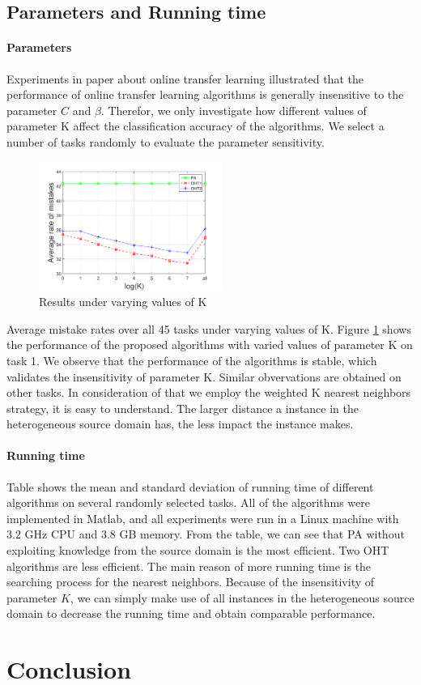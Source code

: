 \documentclass[letterpaper]{article}
\begin{document}
\subsection{Parameters and Running time}
\paragraph{Parameters}
Experiments in paper about online transfer learning illustrated that the performance of online transfer learning algorithms is generally insensitive to the parameter $C$ and $\beta$.
Therefor, we only investigate how different values of parameter K affect the classification accuracy of the algorithms.
We select a number of tasks randomly to evaluate the parameter sensitivity.


\begin{figure}[!htb]
\begin{center}
  \includegraphics[width=6cm]{average.pdf}
  \caption{Results under varying values of K}
  \label{average eok}
\end{center}
\end{figure}

Average mistake rates over all 45 tasks under varying values of K.
Figure \ref{average eok} shows the performance of the proposed algorithms with varied values of parameter K on task 1.
We observe that the performance of the algorithms is stable, which validates the insensitivity of parameter K.
Similar obvervations are obtained on other tasks.
In consideration of that we employ the weighted K nearest neighbors strategy, it is easy to understand.
The larger distance a instance in the heterogeneous source domain has, the less impact the instance makes.

\paragraph{Running time}
Table shows the mean and standard deviation of running time of different algorithms on several randomly selected tasks.
All of the algorithms were implemented in Matlab, and all experiments were run in a Linux machine with 3.2 GHz CPU and 3.8 GB memory.
From the table, we can see that PA without exploiting knowledge from the source domain is the most efficient.
Two OHT algorithms are less efficient.
The main reason of more running time is the searching process for the nearest neighbors.
Because of the insensitivity of parameter $K$, we can simply make use of all instances in the heterogeneous source domain to decrease the running time and obtain comparable performance.

\section{Conclusion}
\end{document}
